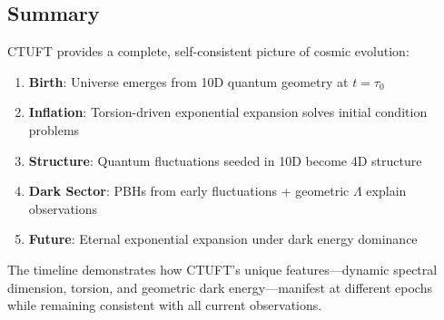 \subsection{Summary}

CTUFT provides a complete, self-consistent picture of cosmic evolution:

\begin{enumerate}
    \item \textbf{Birth}: Universe emerges from 10D quantum geometry at $t = \tau_0$
    \item \textbf{Inflation}: Torsion-driven exponential expansion solves initial condition problems
    \item \textbf{Structure}: Quantum fluctuations seeded in 10D become 4D structure
    \item \textbf{Dark Sector}: PBHs from early fluctuations + geometric $\Lambda$ explain observations
    \item \textbf{Future}: Eternal exponential expansion under dark energy dominance
\end{enumerate}

The timeline demonstrates how CTUFT's unique features—dynamic spectral dimension, torsion, and geometric dark energy—manifest at different epochs while remaining consistent with all current observations.